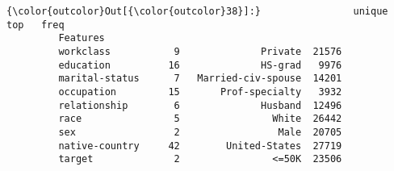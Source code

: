 \documentclass[11pt]{article}
\begin{document}
\begin{Verbatim}[commandchars=\\\{\}]
{\color{outcolor}Out[{\color{outcolor}38}]:}                unique                  top   freq
         Features                                         
         workclass           9              Private  21576
         education          16              HS-grad   9976
         marital-status      7   Married-civ-spouse  14201
         occupation         15       Prof-specialty   3932
         relationship        6              Husband  12496
         race                5                White  26442
         sex                 2                 Male  20705
         native-country     42        United-States  27719
         target              2                <=50K  23506
\end{Verbatim}
            
\end{document}
